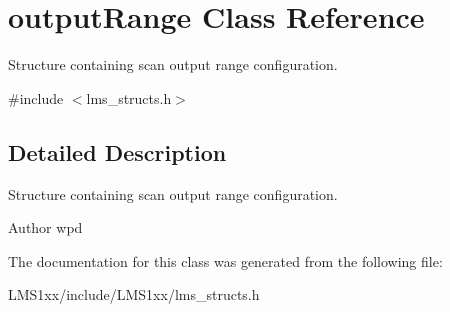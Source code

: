 \hypertarget{classoutputRange}{}\section{output\+Range Class Reference}
\label{classoutputRange}


Structure containing scan output range configuration.  




{\ttfamily \#include $<$lms\+\_\+structs.\+h$>$}



\subsection{Detailed Description}
Structure containing scan output range configuration. 

\begin{DoxyAuthor}{Author}
wpd 
\end{DoxyAuthor}


The documentation for this class was generated from the following file\+:\begin{DoxyCompactItemize}
\item 
L\+M\+S1xx/include/\+L\+M\+S1xx/lms\+\_\+structs.\+h\end{DoxyCompactItemize}
